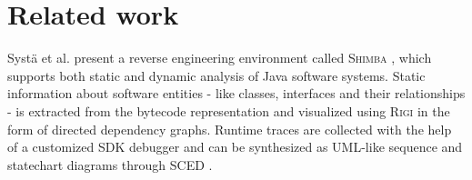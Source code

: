 \chapter{Related work}
\thispagestyle{fancy}
\label{c:relatedwork}

Systä et al. present a reverse engineering environment called \textsc{Shimba} \cite{systa2001shimba}, which supports both static and dynamic analysis of Java software systems.
Static information about software entities - like classes, interfaces and their relationships - is extracted from the bytecode representation and visualized using \textsc{Rigi} \citep{Muller:1993:USS:962289.962309} in the form of directed dependency graphs.
Runtime traces are collected with the help of a customized SDK debugger and can be synthesized as UML-like sequence and statechart diagrams through \textsc{SCED} \citep{Koskimies:1998:ASM:624623.625817,891472}.
